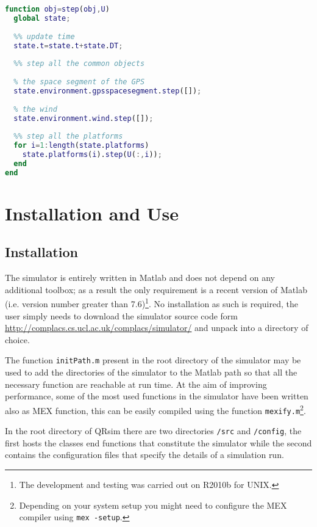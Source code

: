 \documentclass[a4paper,11pt]{report}
\newcommand{\sname}{QRsim\xspace}
\newcommand{\web}{\url{http://complacs.cs.ucl.ac.uk/complacs/simulator/}\xspace}
\begin{document}
\begin{lstlisting}[float=ht!bp,caption=\sname step() method,language=Matlab,frame=lines,label=lst:step,firstnumber=100]
function obj=step(obj,U)
  global state;
           
  %% update time
  state.t=state.t+state.DT;
                        
  %% step all the common objects
            
  % the space segment of the GPS
  state.environment.gpsspacesegment.step([]);
            
  % the wind
  state.environment.wind.step([]);
            
  %% step all the platforms            
  for i=1:length(state.platforms)
    state.platforms(i).step(U(:,i));
  end
end
\end{lstlisting}


\chapter{Installation and Use}

\section{Installation}
The simulator is entirely written in Matlab and does not depend on any additional toolbox; as a result the only requirement is a recent version of Matlab (i.e. version number greater  than 7.6)\footnote{The development and testing was carried out on R2010b for UNIX.}.
No installation as such is required, the user simply needs to download the simulator source code form \web and unpack into a directory of choice.

The function \texttt{initPath.m} present in the root directory of the simulator may be used to add the directories of the simulator to the Matlab path so that all the necessary function are reachable at run time.
At the aim of improving performance, some of the most used functions in the simulator have been written also as MEX function, this can be easily compiled using the function \texttt{mexify.m}\footnote{Depending on your system setup you might need to configure the MEX compiler using \texttt{mex -setup}.}.
 
In the root directory of \sname there are two directories \texttt{/src} and \texttt{/config}, the first hosts the classes end functions that constitute the simulator while the second contains the configuration files that specify the details of a simulation run.
\end{document}
